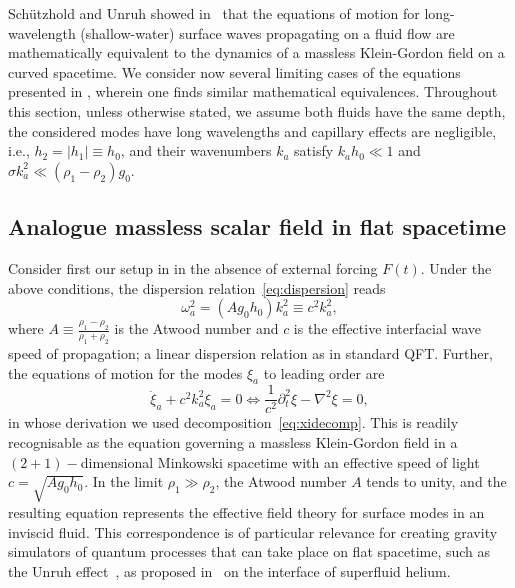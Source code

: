 \documentclass[a4paper]{jpconf}
\begin{document}
Sch{\"u}tzhold and Unruh showed in~\cite{schutzhold2002gravity} that the equations of motion for long-wavelength (shallow-water) surface waves propagating on a fluid flow are mathematically equivalent to the dynamics of a massless Klein-Gordon field on a curved spacetime. We consider now several limiting cases of the equations presented in , wherein one finds similar mathematical equivalences. Throughout this section, unless otherwise stated, we assume both fluids have the same depth, the considered modes have long wavelengths and capillary effects are negligible, i.e., $h_2=|h_1|\equiv h_0$, and their wavenumbers $k_a$ satisfy $k_a h_0 \ll 1$ and $\sigma k_a^2\ll (\rho_1-\rho_2)g_0$.

\subsection{Analogue massless scalar field in flat spacetime}
Consider first our setup in  in the absence of external forcing $F(t)$. Under the above conditions, the dispersion relation~\eqref{eq:dispersion} reads
\begin{equation}
    \omega_a^2 = (A g_0 h_0) k_a^2\equiv c^2 k_a^2,
\end{equation}
where $A\equiv \tfrac{\rho_1-\rho_2}{\rho_1+\rho_2}$ is the Atwood number and $c$ is the effective interfacial wave speed of propagation; a linear dispersion relation as in standard QFT. Further, the equations of motion for the modes $\xi_a$ to leading order are
\begin{equation}
\label{eq:analogueMinkowski}
    \ddot{\xi}_a+c^2 k_a^2\xi_a=0 \Leftrightarrow \frac{1}{c^2}\partial^2_t\xi-\nabla^2\xi=0,
\end{equation}
in whose derivation we used decomposition~\eqref{eq:xidecomp}. This is readily recognisable as the equation governing a massless Klein-Gordon field in a $(2+1)-$dimensional Minkowski spacetime with an effective speed of light $c=\sqrt{A g_0 h_0}$. In the limit $\rho_1\gg\rho_2$, the Atwood number $A$ tends to unity, and the resulting equation represents the effective field theory for surface modes in an inviscid fluid. This correspondence is of particular relevance for creating gravity simulators of quantum processes that can take place on flat spacetime, such as the Unruh effect~\cite{PhysRevD.14.870}, as proposed in~\cite{BunneyCircular, bunney2023third} on the interface of superfluid helium.
\end{document}
